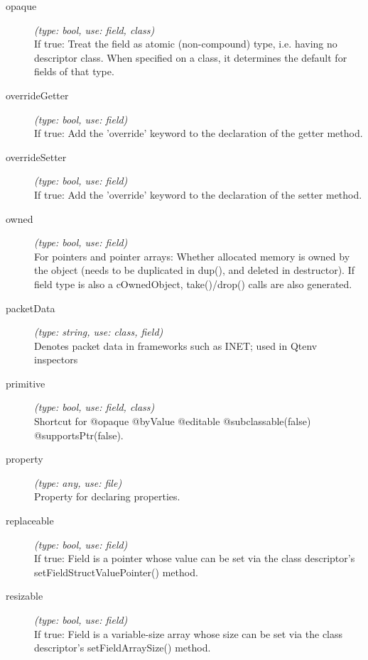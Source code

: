 \begin{description}
\item[opaque] \textit{(type: bool, use: field, class)} \\
    If true: Treat the field as atomic (non-compound) type, i.e. having no
    descriptor class. When specified on a class, it determines the default for
    fields of that type.

\item[overrideGetter] \textit{(type: bool, use: field)} \\
    If true: Add the 'override' keyword to the declaration of the getter method.

\item[overrideSetter] \textit{(type: bool, use: field)} \\
    If true: Add the 'override' keyword to the declaration of the setter method.

\item[owned] \textit{(type: bool, use: field)} \\
    For pointers and pointer arrays: Whether allocated memory is owned by the
    object (needs to be duplicated in dup(), and deleted in destructor). If
    field type is also a cOwnedObject, take()/drop() calls are also generated.

\item[packetData] \textit{(type: string, use: class, field)} \\
    Denotes packet data in frameworks such as INET; used in Qtenv inspectors

\item[primitive] \textit{(type: bool, use: field, class)} \\
    Shortcut for @opaque @byValue @editable @subclassable(false)
    @supportsPtr(false).

\item[property] \textit{(type: any, use: file)} \\
    Property for declaring properties.

\item[replaceable] \textit{(type: bool, use: field)} \\
    If true: Field is a pointer whose value can be set via the class
    descriptor's setFieldStructValuePointer() method.

\item[resizable] \textit{(type: bool, use: field)} \\
    If true: Field is a variable-size array whose size can be set via the class
    descriptor's setFieldArraySize() method.


\end{description}
